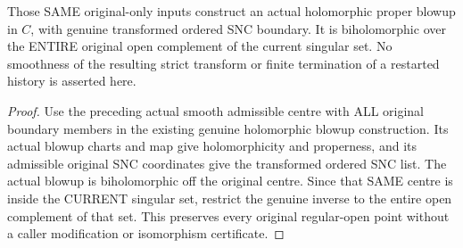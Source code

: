\begin{theorem}
\label{hir:actual-current-full-hs-singular-first-blowup}
\leanok
Those SAME original-only inputs construct an actual holomorphic proper
blowup in $C$, with genuine transformed ordered SNC boundary. It is
biholomorphic over the ENTIRE original open complement of the current
singular set. No smoothness of the resulting strict transform or finite
termination of a restarted history is asserted here.
\end{theorem}
\begin{proof}
Use the preceding actual smooth admissible centre with ALL original boundary
members in the existing genuine holomorphic blowup construction. Its actual
blowup charts and map give holomorphicity and properness, and its admissible
original SNC coordinates give the transformed ordered SNC list. The actual
blowup is biholomorphic off the original centre. Since that SAME centre is
inside the CURRENT singular set, restrict the genuine inverse to the entire
open complement of that set. This preserves every original regular-open
point without a caller modification or isomorphism certificate.
\end{proof}
